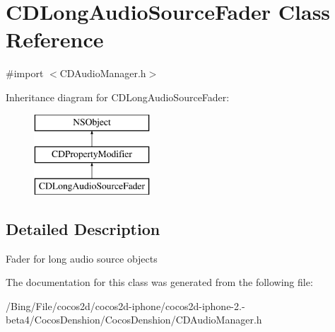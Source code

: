 \hypertarget{interface_c_d_long_audio_source_fader}{\section{C\-D\-Long\-Audio\-Source\-Fader Class Reference}
\label{interface_c_d_long_audio_source_fader}
}


{\ttfamily \#import $<$C\-D\-Audio\-Manager.\-h$>$}

Inheritance diagram for C\-D\-Long\-Audio\-Source\-Fader\-:\begin{figure}[H]
\begin{center}
\leavevmode
\includegraphics[height=3.000000cm]{interface_c_d_long_audio_source_fader}
\end{center}
\end{figure}


\subsection{Detailed Description}
Fader for long audio source objects 

The documentation for this class was generated from the following file\-:\begin{DoxyCompactItemize}
\item 
/\-Bing/\-File/cocos2d/cocos2d-\/iphone/cocos2d-\/iphone-\/2.-\/beta4/\-Cocos\-Denshion/\-Cocos\-Denshion/C\-D\-Audio\-Manager.\-h\end{DoxyCompactItemize}
